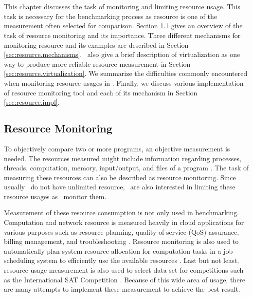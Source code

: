 \fancyhead[LE,RO]{\thepage}

\chapter{\chResource}
\label{ch:resource}

This chapter discusses the task of monitoring and limiting resource usage.
This task is necessary for the benchmarking process as resource is one of the measurement often selected for comparison.
Section \ref{sec:resource.overview} gives an overview of the task of resource monitoring and its importance.
Three different mechanisms for monitoring resource and its examples are described in Section \ref{sec:resource.mechanisms}.
\First~also give a brief description of virtualization as one way to produce more reliable resource measurement in Section \ref{sec:resource.virtualization}.
We summarize the difficulties commonly encountered when monitoring resource usages in .
Finally, we discuss various implementation of resource monitoring tool and each of its mechanism in Section \ref{sec:resource.impl}.

\section{Resource Monitoring}
\label{sec:resource.overview}

To objectively compare two or more programs, an objective measurement is needed.
The resources measured might include information regarding processes, threads, computation, memory, input/output, and files of a program \citep{juvePracticalResourceMonitoring2015}.
The task of measuring these resources can also be described as resource monitoring.
Since usually \first~do not have unlimited resource, \first~are also interested in limiting these resource usages as \first~monitor them.

Measurement of these resource consumption is not only used in benchmarking.
Computation and network resource is measured heavily in cloud applications for various purposes such as resource planning, quality of service (QoS) assurance, billing management, and troubleshooting \citep{aceto2013cloud}.
Resource monitoring is also used to automatically plan system resource allocation for computation tasks in a job scheduling system to efficiently use the available resources \citep{tovarJobSizingStrategy2018}.
Last but not least, resource usage measurement is also used to select data set for competitions such as the International SAT Competition \citep{heule2018proceedings}.
Because of this wide area of usage, there are many attempts to implement these measurement to achieve the best result.

